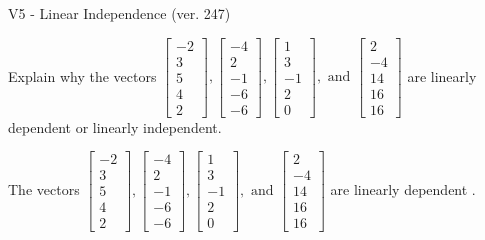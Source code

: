\begin{exercise}
  \begin{exerciseTitle}V5 - Linear Independence (ver. 247)\end{exerciseTitle}
  \begin{exerciseStatement}
    Explain why the vectors \(\left[\begin{array}{r}
-2 \\
3 \\
5 \\
4 \\
2
\end{array}\right] , \left[\begin{array}{r}
-4 \\
2 \\
-1 \\
-6 \\
-6
\end{array}\right] , \left[\begin{array}{r}
1 \\
3 \\
-1 \\
2 \\
0
\end{array}\right] , \text{ and } \left[\begin{array}{r}
2 \\
-4 \\
14 \\
16 \\
16
\end{array}\right]\) are linearly dependent or linearly independent.	


  \end{exerciseStatement}
  \begin{exerciseAnswer}
   The vectors \(\left[\begin{array}{r}
-2 \\
3 \\
5 \\
4 \\
2
\end{array}\right] , \left[\begin{array}{r}
-4 \\
2 \\
-1 \\
-6 \\
-6
\end{array}\right] , \left[\begin{array}{r}
1 \\
3 \\
-1 \\
2 \\
0
\end{array}\right] , \text{ and } \left[\begin{array}{r}
2 \\
-4 \\
14 \\
16 \\
16
\end{array}\right]\) are 
  	 linearly dependent  .
  


  \end{exerciseAnswer}
\end{exercise}